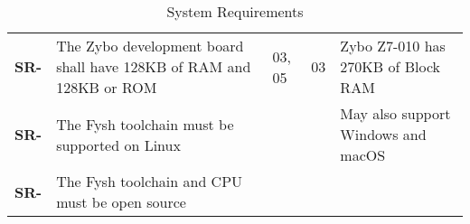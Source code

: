\resetfyshcounter
\newcommand{\sr}[4]{
	\textbf{SR-\rc} & #1 & #2 & #3 & #4 \\
	\hline
}
\begin{table}[H]
	\begin{tabularx}{\textwidth}{| a | x | a | a | a |}
		\hline

		 &  %
		           &                           %
		           &                           %
		           &                           \\
		\hline
		\sr{The Zybo development board shall have 128KB of RAM and 128KB or ROM}%
		{03, 05}%
		{03}%
		{Zybo Z7-010 has 270KB of Block RAM} %

		\sr{The Fysh toolchain must be supported on Linux}%
		{}%
		{}%
		{May also support Windows and macOS}

		\sr{The Fysh toolchain and CPU must be open source}%
		{}%
		{}%
		{}
	\end{tabularx}
	\caption{System Requirements}
\end{table}

